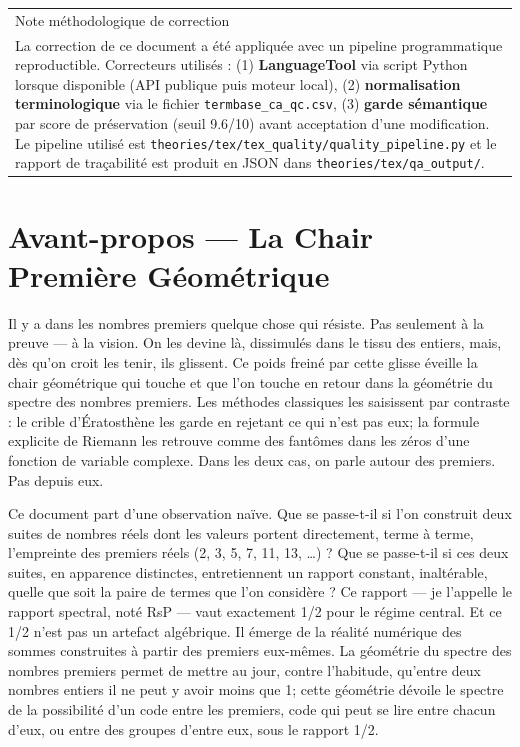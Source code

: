 \documentclass[11pt,a4paper]{article}
\begin{document}
\begin{longtable}{|p{}|}
\hline
Note méthodologique de correction \\ La correction de ce document a été appliquée avec un pipeline programmatique reproductible. Correcteurs utilisés : (1) \textbf{LanguageTool} via script Python lorsque disponible (API publique puis moteur local), (2) \textbf{normalisation terminologique} via le fichier \texttt{termbase\_ca\_qc.csv}, (3) \textbf{garde sémantique} par score de préservation (seuil 9.6/10) avant acceptation d'une modification. Le pipeline utilisé est \texttt{theories/tex/tex\_quality/quality\_pipeline.py} et le rapport de traçabilité est produit en JSON dans \texttt{theories/tex/qa\_output/}. \\ 
\hline
\end{longtable}



\section{Avant-propos — La Chair Première Géométrique}
Il y a dans les nombres premiers quelque chose qui résiste. Pas seulement à la preuve — à la vision. On les devine là, dissimulés dans le tissu des entiers, mais, dès qu'on croit les tenir, ils glissent. Ce poids freiné par cette glisse éveille la chair géométrique qui touche et que l'on touche en retour dans la géométrie du spectre des nombres premiers. Les méthodes classiques les saisissent par contraste : le crible d'Ératosthène les garde en rejetant ce qui n'est pas eux; la formule explicite de Riemann les retrouve comme des fantômes dans les zéros d'une fonction de variable complexe. Dans les deux cas, on parle autour des premiers. Pas depuis eux.

Ce document part d'une observation naïve. Que se passe-t-il si l'on construit deux suites de nombres réels dont les valeurs portent directement, terme à terme, l'empreinte des premiers réels (2, 3, 5, 7, 11, 13, …) ? Que se passe-t-il si ces deux suites, en apparence distinctes, entretiennent un rapport constant, inaltérable, quelle que soit la paire de termes que l'on considère ? Ce rapport — je l'appelle le rapport spectral, noté RsP — vaut exactement 1/2 pour le régime central. Et ce 1/2 n'est pas un artefact algébrique. Il émerge de la réalité numérique des sommes construites à partir des premiers eux-mêmes. La géométrie du spectre des nombres premiers permet de mettre au jour, contre l'habitude, qu'entre deux nombres entiers il ne peut y avoir moins que 1; cette géométrie dévoile le spectre de la possibilité d'un code entre les premiers, code qui peut se lire entre chacun d'eux, ou entre des groupes d'entre eux, sous le rapport 1/2.
\end{document}

